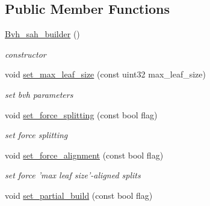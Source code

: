\subsection*{\-Public \-Member \-Functions}
\begin{DoxyCompactItemize}
\item 
\hypertarget{classnih_1_1_bvh__sah__builder_ab661bd7a124f248024f610a5375999ff}{
\hyperlink{classnih_1_1_bvh__sah__builder_ab661bd7a124f248024f610a5375999ff}{\-Bvh\-\_\-sah\-\_\-builder} ()}
\label{classnih_1_1_bvh__sah__builder_ab661bd7a124f248024f610a5375999ff}

\begin{DoxyCompactList}\small\item\em constructor \end{DoxyCompactList}\item 
\hypertarget{classnih_1_1_bvh__sah__builder_abf1b7f40c72041ba506cbab839a87422}{
void \hyperlink{classnih_1_1_bvh__sah__builder_abf1b7f40c72041ba506cbab839a87422}{set\-\_\-max\-\_\-leaf\-\_\-size} (const uint32 max\-\_\-leaf\-\_\-size)}
\label{classnih_1_1_bvh__sah__builder_abf1b7f40c72041ba506cbab839a87422}

\begin{DoxyCompactList}\small\item\em set bvh parameters \end{DoxyCompactList}\item 
\hypertarget{classnih_1_1_bvh__sah__builder_a77428bfa9452f5293795ceac44a22c7a}{
void \hyperlink{classnih_1_1_bvh__sah__builder_a77428bfa9452f5293795ceac44a22c7a}{set\-\_\-force\-\_\-splitting} (const bool flag)}
\label{classnih_1_1_bvh__sah__builder_a77428bfa9452f5293795ceac44a22c7a}

\begin{DoxyCompactList}\small\item\em set force splitting \end{DoxyCompactList}\item 
\hypertarget{classnih_1_1_bvh__sah__builder_a5cf76e37ce58b2b8b98d86dfaadf6598}{
void \hyperlink{classnih_1_1_bvh__sah__builder_a5cf76e37ce58b2b8b98d86dfaadf6598}{set\-\_\-force\-\_\-alignment} (const bool flag)}
\label{classnih_1_1_bvh__sah__builder_a5cf76e37ce58b2b8b98d86dfaadf6598}

\begin{DoxyCompactList}\small\item\em set force 'max leaf size'-\/aligned splits \end{DoxyCompactList}\item 
\hypertarget{classnih_1_1_bvh__sah__builder_a9fffff6b80bf9452cae3a807e38f7e03}{
void \hyperlink{classnih_1_1_bvh__sah__builder_a9fffff6b80bf9452cae3a807e38f7e03}{set\-\_\-partial\-\_\-build} (const bool flag)}
\label{classnih_1_1_bvh__sah__builder_a9fffff6b80bf9452cae3a807e38f7e03}


\end{DoxyCompactItemize}
